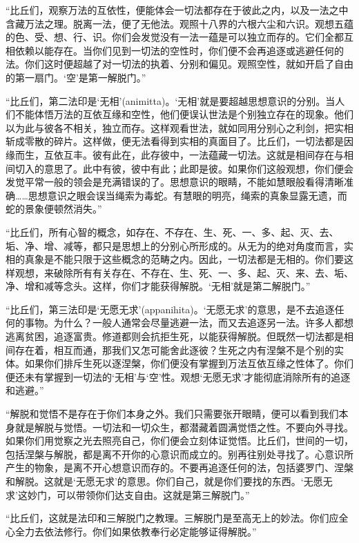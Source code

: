 \documentclass[12pt,twoside,openany]{book}
\begin{document}
“比丘们，观察万法的互依性，便能体会一切法都存在于彼此之内，以及一法之中含藏万法之理。脱离一法，便了无他法。观照十八界的六根六尘和六识。观想五蕴的色、受、想、行、识。你们会发觉没有一法一蕴是可以独立而存的。它们全都互相依赖以能存在。当你们见到一切法的空性时，你们便不会再追逐或逃避任何的法。你们这时便超越了对一切法的执着、分别和偏见。观照空性，就如开启了自由的第一扇门。‘空’是第一解脱门。”

“比丘们，第二法印是‘无相’(animitta)。‘无相’就是要超越思想意识的分别。当人们不能体悟万法的互依互缘和空性，他们便误认世法是个别独立存在的现象。他们以为此与彼各不相关，独立而存。这样观看世法，就如同用分别心之利剑，把实相斩成零散的碎片。这样做，便无法看得到实相的真面目了。比丘们，一切法都是因缘而生，互依互丰。彼有此在，此存彼中，一法蕴藏一切法。这就是相间存在与相间切入的意思了。此中有彼，彼中有此；此即是彼。如果你们这般观想，你们便会发觉平常一般的领会是充满错误的了。思想意识的眼睛，不能如慧眼般看得清晰准确……思想意识之眼会误当绳索为毒蛇。有慧眼的明亮，绳索的真象显露无遗，而蛇的景象便顿然消失。”

“比丘们，所有心智的概念，如存在、不存在、生、死、一、多、起、灭、去、垢、净、增、减等，都只是思想上的分别心所形成的。从无为的绝对角度而言，实相的真象是不能只限于这些概念的范畴之内。因此，一切法都是无相的。你们要这样观想，来破除所有有关存在、不存在、生、死、一、多、起、灭、来、去、垢、净、增和减等念头。这样，你们才能获得解脱。‘无相’就是第二解脱门。”

“比丘们，第三法印是‘无愿无求’(appanihita)。‘无愿无求’的意思，是不去追逐任何的事物。为什么？一般人通常会尽量逃避一法，而又去追逐另一法。许多人都想逃离贫困，追逐富贵。修道都则会抗拒生死，以能获得解脱。但既然一切法都是相间存在着，相互而通，那我们又怎可能舍此逐彼？生死之内有涅槃不是个别的实体。如果你们排斥生死以逐涅槃，你们便没有掌握到万法互依互缘之性体了。你们便还未有掌握到一切法的‘无相’与‘空’性。观想‘无愿无求’才能彻底消除所有的追逐和逃避。”

“解脱和觉悟不是存在于你们本身之外。我们只需要张开眼睛，便可以看到我们本身就是解脱与觉悟。一切法和一切众生，都潜藏着圆满觉悟之性。不要向外寻找。如果你们用觉察之光去照亮自己，你们便会立刻体证觉悟。比丘们，世间的一切，包括涅槃与解脱，都是离不开你的心意识而成立的。别再往别处寻找了。心意识所产生的物象，是离不开心想意识而存的。不要再追逐任何的法，包括婆罗门、涅槃和解脱。这就是‘无愿无求’的意思。你们自己，就是你们要找的东西。‘无愿无求’这妙门，可以带领你们达支自由。这就是第三解脱门。”

“比丘们，这就是法印和三解脱门之教理。三解脱门是至高无上的妙法。你们应全心全力去依法修行。你们如果依教奉行必定能够证得解脱。”
\end{document}
